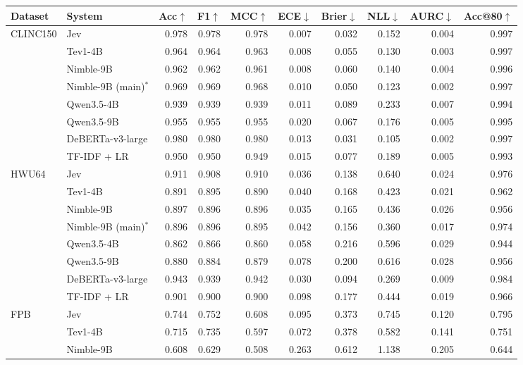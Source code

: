 \begin{tabular}{llrrrrrrrr}
\toprule
Dataset & System & Acc$\uparrow$ & F1$\uparrow$ & MCC$\uparrow$ & ECE$\downarrow$ & Brier$\downarrow$ & NLL$\downarrow$ & AURC$\downarrow$ & Acc@80$\uparrow$ \\
\midrule
CLINC150 & Jev & 0.978 & 0.978 & 0.978 & 0.007 & 0.032 & 0.152 & 0.004 & 0.997 \\
 & Tev1-4B & 0.964 & 0.964 & 0.963 & 0.008 & 0.055 & 0.130 & 0.003 & 0.997 \\
 & Nimble-9B & 0.962 & 0.962 & 0.961 & 0.008 & 0.060 & 0.140 & 0.004 & 0.996 \\
 & Nimble-9B (main)$^\ast$ & 0.969 & 0.969 & 0.968 & 0.010 & 0.050 & 0.123 & 0.002 & 0.997 \\
 & Qwen3.5-4B & 0.939 & 0.939 & 0.939 & 0.011 & 0.089 & 0.233 & 0.007 & 0.994 \\
 & Qwen3.5-9B & 0.955 & 0.955 & 0.955 & 0.020 & 0.067 & 0.176 & 0.005 & 0.995 \\
 & DeBERTa-v3-large & 0.980 & 0.980 & 0.980 & 0.013 & 0.031 & 0.105 & 0.002 & 0.997 \\
 & TF-IDF + LR & 0.950 & 0.950 & 0.949 & 0.015 & 0.077 & 0.189 & 0.005 & 0.993 \\
\midrule
HWU64 & Jev & 0.911 & 0.908 & 0.910 & 0.036 & 0.138 & 0.640 & 0.024 & 0.976 \\
 & Tev1-4B & 0.891 & 0.895 & 0.890 & 0.040 & 0.168 & 0.423 & 0.021 & 0.962 \\
 & Nimble-9B & 0.897 & 0.896 & 0.896 & 0.035 & 0.165 & 0.436 & 0.026 & 0.956 \\
 & Nimble-9B (main)$^\ast$ & 0.896 & 0.896 & 0.895 & 0.042 & 0.156 & 0.360 & 0.017 & 0.974 \\
 & Qwen3.5-4B & 0.862 & 0.866 & 0.860 & 0.058 & 0.216 & 0.596 & 0.029 & 0.944 \\
 & Qwen3.5-9B & 0.880 & 0.884 & 0.879 & 0.078 & 0.200 & 0.616 & 0.028 & 0.956 \\
 & DeBERTa-v3-large & 0.943 & 0.939 & 0.942 & 0.030 & 0.094 & 0.269 & 0.009 & 0.984 \\
 & TF-IDF + LR & 0.901 & 0.900 & 0.900 & 0.098 & 0.177 & 0.444 & 0.019 & 0.966 \\
\midrule
FPB & Jev & 0.744 & 0.752 & 0.608 & 0.095 & 0.373 & 0.745 & 0.120 & 0.795 \\
 & Tev1-4B & 0.715 & 0.735 & 0.597 & 0.072 & 0.378 & 0.582 & 0.141 & 0.751 \\
 & Nimble-9B & 0.608 & 0.629 & 0.508 & 0.263 & 0.612 & 1.138 & 0.205 & 0.644 \\

\end{tabular}
